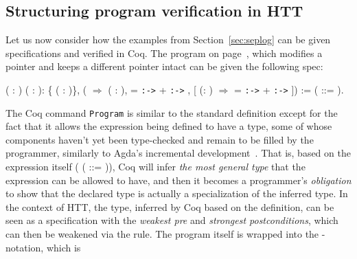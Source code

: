 \subsection{Structuring program verification in HTT}


Let us now consider how the examples from Section~\ref{sec:seplog}
can be given specifications and verified in Coq. The program on
page~\pageref{pg:alterx}, which modifies a pointer  and keeps a
different pointer  intact can be given the following spec:
\begin{coqdoccode}
\coqdocemptyline
\coqdocemptyline
\coqdocnoindent
{}   ( : ) ( : ): \coqdoceol
\coqdocindent{1.00em}
\{ ( : )\}, \coqdoceol
\coqdocindent{1.00em}
 (  \ensuremath{\Rightarrow}   ( : ),  =  \texttt{:->}  +  \texttt{:->} ,\coqdoceol
\coqdocindent{4.00em}
[ (\coqdocvar{\_}: )  \ensuremath{\Rightarrow}  =  \texttt{:->}  +  \texttt{:->} ]) := \coqdoceol
\coqdocindent{1.00em}
 ( ::= ).\coqdoceol
\coqdocemptyline
\end{coqdoccode}
The Coq command \texttt{Program}  is similar to the
standard definition  except for the fact that it allows
the expression being defined to have a type, some of whose components
haven't yet been type-checked and remain to be filled by the
programmer, similarly to Agda's  incremental
development~\cite{Sozeau:TYPES06}. That is, based on the expression
itself ( ( ::= )), Coq will infer \textit{the most general type} that
the expression can be allowed to have, and then it becomes a
programmer's \textit{obligation} to show that the declared type is actually a
specialization of the inferred type. In the context of HTT,
the type, inferred by Coq based on the definition, can be seen
as a specification with the \textit{weakest pre} and \textit{strongest
postconditions}, which can then be weakened via the 
rule. The program itself is wrapped into the -notation, which is
